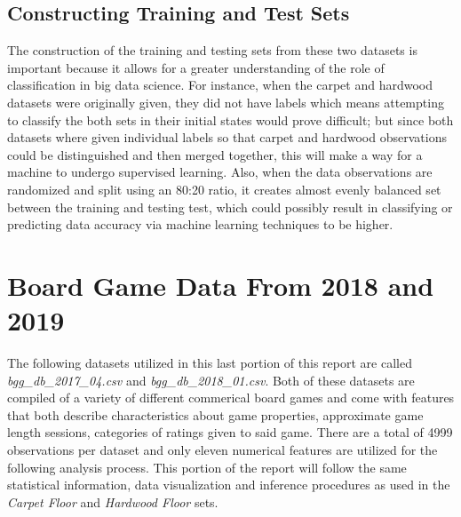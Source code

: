 \documentclass[a4paper,12pt]{IEEEtran}
\begin{document}
\subsection{Constructing Training and Test Sets}
\label{sec4}
The construction of the training and testing sets from these two datasets is important because it allows for a greater understanding of the role of classification in big data science. For instance, when the carpet and hardwood datasets were originally given, they did not have labels which means attempting to classify the both sets in their initial states would prove difficult; but since both datasets where given individual labels so that carpet and hardwood observations could be distinguished and then merged together, this will make a way for a machine to undergo supervised learning. Also, when the data observations are randomized and split using an 80:20 ratio, it creates almost evenly balanced set between the training and testing test, which could possibly result in classifying or predicting data accuracy via machine learning techniques to be higher.

\section{Board Game Data From 2018 and 2019}
The following datasets utilized in this last portion of this report are called \textit{bgg\_db\_2017\_04.csv} and \textit{bgg\_db\_2018\_01.csv}. Both of these datasets are compiled of a variety of different commerical board games and come with features that both describe characteristics about game properties, approximate game length sessions, categories of ratings given to said game. There are a total of 4999 observations per dataset and only eleven numerical features are utilized for the following analysis process. This portion of the report will follow the same statistical information, data visualization and inference procedures as used in the \textit{Carpet Floor} and \textit{Hardwood Floor} sets.
\end{document}
